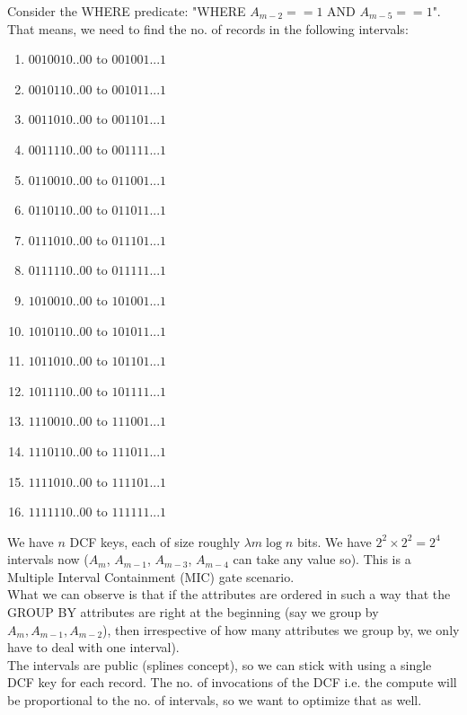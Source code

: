Consider the WHERE predicate: "WHERE $A_{m-2} == 1$ AND $A_{m-5} == 1$". \\

That means, we need to find the no. of records in the following intervals:
\begin{enumerate}
    \item $0010010..00$ to $001001...1$
    \item $0010110..00$ to $001011...1$
    \item $0011010..00$ to $001101...1$
    \item $0011110..00$ to $001111...1$
    \item $0110010..00$ to $011001...1$
    \item $0110110..00$ to $011011...1$
    \item $0111010..00$ to $011101...1$
    \item $0111110..00$ to $011111...1$
    \item $1010010..00$ to $101001...1$
    \item $1010110..00$ to $101011...1$
    \item $1011010..00$ to $101101...1$
    \item $1011110..00$ to $101111...1$
    \item $1110010..00$ to $111001...1$
    \item $1110110..00$ to $111011...1$
    \item $1111010..00$ to $111101...1$
    \item $1111110..00$ to $111111...1$
\end{enumerate}

We have $n$ DCF keys, each of size roughly $\lambda m \log n$ bits. We have $2^2 \times 2^2 = 2^4$ intervals now ($A_m$, $A_{m-1}$, $A_{m-3}$, $A_{m-4}$ can take any value so). This is a Multiple Interval Containment (MIC) gate scenario. \\

What we can observe is that if the attributes are ordered in such a way that the GROUP BY attributes are right at the beginning (say we group by $A_m, A_{m-1}, A_{m-2}$), then irrespective of how many attributes we group by, we only have to deal with one interval).\\

The intervals are public (splines concept), so we can stick with using a single DCF key for each record. The no. of invocations of the DCF i.e. the compute will be proportional to the no. of intervals, so we want to optimize that as well.






%
